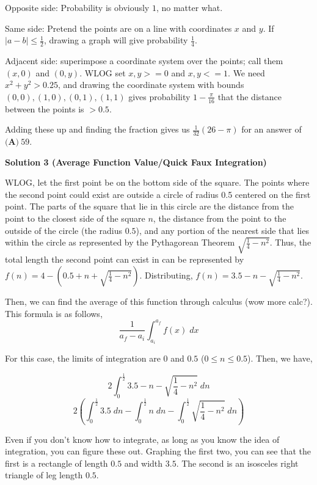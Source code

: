 \begin{enumerate}
 Opposite side: Probability is obviously $1$, no matter what. 

 Same side: Pretend the points are on a line with coordinates $x$ and $y$. If $|a-b| \le \frac{1}{2}$, drawing a graph will give probability $\frac{1}{4}$.

 Adjacent side: superimpose a coordinate system over the points; call them $(x, 0)$ and $(0, y)$. WLOG set $x, y >= 0$ and $x, y <= 1$. We need $x^2+y^2>0.25$, and drawing the coordinate system with bounds $(0, 0), (1, 0), (0, 1), (1, 1)$ gives probability $1-\frac{\pi}{16}$ that the distance between the points is $>0.5$.

 Adding these up and finding the fraction gives us $\frac{1}{32} (26 - \pi)$ for an answer of $\textbf{(A)}\ 59$.

 



\textbf{Solution 3 (Average Function Value/Quick Faux Integration)}

WLOG, let the first point be on the bottom side of the square. The points where the second point could exist are outside a circle of radius 0.5 centered on the first point. The parts of the square that lie in this circle are the distance from the point to the closest side of the square $n$, the distance from the point to the outside of the circle (the radius $0.5$), and any portion of the nearest side that lies within the circle as represented by the Pythagorean Theorem $\sqrt{\frac{1}{4}-n^2}$. Thus, the total length the second point can exist in can be represented by $f(n)=4-(0.5+n+\sqrt{\frac{1}{4}-n^2})$. Distributing, $f(n)=3.5-n-\sqrt{\frac{1}{4}-n^2}$.

 Then, we can find the average of this function through calculus (wow more calc?). This formula is as follows,
 \[\frac{1}{a_{f} -a_{i}} \int_{a_{i}}^{a_{f}} f(x)\;dx\]

 For this case, the limits of integration are $0$ and $0.5$ ($0\leq n\leq 0.5$). Then, we have,

 
 \[2\int_{0}^{\frac{1}{2}} 3.5-n-\sqrt{\frac{1}{4}-n^2}\;dn\]
 \[2(\int_{0}^{\frac{1}{2}} 3.5\;dn -\int_{0}^{\frac{1}{2}}n\;dn -\int_{0}^{\frac{1}{2}}\sqrt{\frac{1}{4}-n^2}\;dn)\]

 


 Even if you don't know how to integrate, as long as you know the idea of integration, you can figure these out. Graphing the first two, you can see that the first is a rectangle of length $0.5$ and width $3.5$. The second is an isosceles right triangle of leg length $0.5$.


\end{enumerate}
